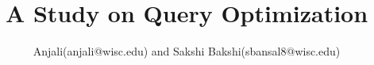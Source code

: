 \documentclass[sigplan,10pt,nonacm]{acmart}
\begin{document}


\title{\textsf{A Study on Query Optimization}}


\author{Anjali(anjali@wisc.edu) and Sakshi Bakshi(sbansal8@wisc.edu)}




\maketitle












{


}
\end{document}
